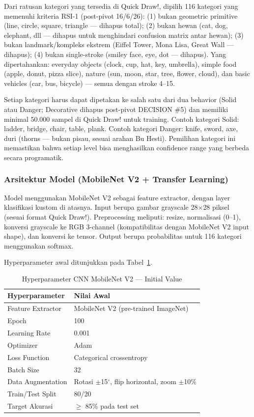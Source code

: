 \documentclass[12pt,a4paper,oneside,openany]{report}
\begin{document}
Dari ratusan kategori yang tersedia di Quick Draw!, dipilih 116 kategori yang memenuhi kriteria RSI-1 (post-pivot 16/6/26): (1) bukan geometric primitive (line, circle, square, triangle --- dihapus total); (2) bukan hewan (cat, dog, elephant, dll --- dihapus untuk menghindari confusion matrix antar hewan); (3) bukan landmark/kompleks ekstrem (Eiffel Tower, Mona Lisa, Great Wall --- dihapus); (4) bukan single-stroke (smiley face, eye, dot --- dihapus). Yang dipertahankan: everyday objects (clock, cup, hat, key, umbrella), simple food (apple, donut, pizza slice), nature (sun, moon, star, tree, flower, cloud), dan basic vehicles (car, bus, bicycle) --- semua dengan stroke 4--15.

Setiap kategori harus dapat dipetakan ke salah satu dari dua behavior (Solid atau Danger; Decorative dihapus post-pivot DECISION \#5) dan memiliki minimal 50.000 sampel di Quick Draw! untuk training. Contoh kategori Solid: ladder, bridge, chair, table, plank. Contoh kategori Danger: knife, sword, axe, duri (thorns --- bukan pisau, sesuai arahan Bu Hesti). Pemilihan kategori ini memastikan bahwa setiap level bisa menghasilkan confidence range yang berbeda secara programatik.

\subsubsection{Arsitektur Model (MobileNet V2 + Transfer Learning)}

Model menggunakan MobileNet V2 sebagai feature extractor, dengan layer klasifikasi kustom di atasnya. Input berupa gambar grayscale 28$\times$28 piksel (sesuai format Quick Draw!). Preprocessing meliputi: resize, normalisasi (0--1), konversi grayscale ke RGB 3-channel (kompatibilitas dengan MobileNet V2 input shape), dan konversi ke tensor. Output berupa probabilitas untuk 116 kategori menggunakan softmax.

Hyperparameter awal ditunjukkan pada Tabel~\ref{tab:hyperparameter}.

\begin{table}[H]
\centering
\caption{Hyperparameter CNN MobileNet V2 --- Initial Value}
\label{tab:hyperparameter}
\begin{tabular}{|l|l|}
\hline
\textbf{Hyperparameter} & \textbf{Nilai Awal} \\ \hline
Feature Extractor & MobileNet V2 (pre-trained ImageNet) \\ \hline
Epoch & 100 \\ \hline
Learning Rate & 0.001 \\ \hline
Optimizer & Adam \\ \hline
Loss Function & Categorical crossentropy \\ \hline
Batch Size & 32 \\ \hline
Data Augmentation & Rotasi $\pm$15$^\circ$, flip horizontal, zoom $\pm$10\% \\ \hline
Train/Test Split & 80/20 \\ \hline
Target Akurasi & $\geq$ 85\% pada test set \\ \hline
\end{tabular}
\end{table}
\end{document}
